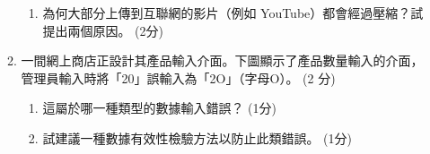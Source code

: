 \documentclass[12pt,a4paper]{article}
\newcommand{\answerline}[1]{\par\vspace{0.5em}\noindent\rule{\linewidth}{0.4pt}\vspace{0.5em}}
\newenvironment{myquestionbox}[1]{%
    \par\vspace{1em}\hrule\vspace{1em}
    \textbf{答案框（共#1分）}\par
    \vspace{1em}\hrule\vspace{1em}
}{%
    \par\vspace{1em}\hrule\vspace{1em}
}
\begin{document}
\begin{enumerate}
\begin{enumerate}
\begin{enumerate}[label=(\alph*)]
    \item 為何大部分上傳到互聯網的影片（例如 YouTube）都會經過壓縮？試提出兩個原因。 (2分)
\end{enumerate}
\item 一間網上商店正設計其產品輸入介面。下圖顯示了產品數量輸入的介面，管理員輸入時將「20」誤輸入為「2O」（字母O）。 (2 分)
\begin{enumerate}[label=(\alph*)]
    \item 這屬於哪一種類型的數據輸入錯誤？ (1分)
    \item 試建議一種數據有效性檢驗方法以防止此類錯誤。 (1分)
\end{enumerate}
\end{enumerate}

\end{enumerate}
\newpage

\end{document}
